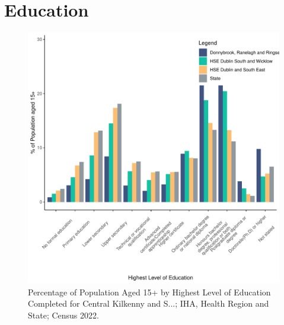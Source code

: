 \documentclass{article}
\begin{document}
\section{Education}\label{sect:Edu}
\begin{figure}[H]
	\centering
	\includegraphics[width = 120mm]{../figures/EduED.pdf}
	\caption{Percentage of Population Aged 15+ by Highest Level of Education Completed for Central Kilkenny and S...; IHA, Health Region and State; Census 2022.}
	\label{fig:vbnv}
	\end{figure}
\end{document}
